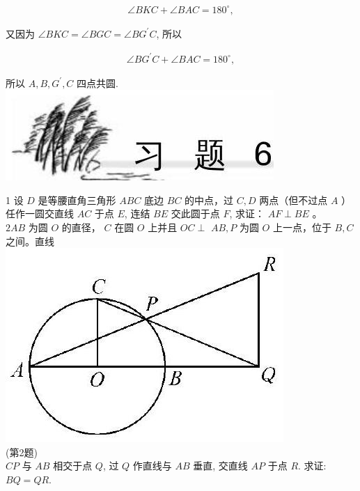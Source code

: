 \documentclass[10pt]{article}
\begin{document}
\begin{align*}
\angle B K C+\angle B A C=180^{\circ},
\end{align*}

又因为 $\angle B K C=\angle B G C=\angle B G^{\prime} C$, 所以

\begin{align*}
\angle B G^{\prime} C+\angle B A C=180^{\circ},
\end{align*}

所以 $A, B, G^{\prime}, C$ 四点共圆.\\
\includegraphics[max width=\textwidth, center]{2024_10_30_66b8e5e701da2093c133g-049}

1 设 $D$ 是等腰直角三角形 $A B C$ 底边 $B C$ 的中点，过 $C, D$ 两点（但不过点 $A$ ）任作一圆交直线 $A C$ 于点 $E$, 连结 $B E$ 交此圆于点 $F$, 求证： $A F \perp B E$ 。\\
$2 A B$ 为圆 $O$ 的直径， $C$ 在圆 $O$ 上并且 $O C \perp$ $A B, P$ 为圆 $O$ 上一点，位于 $B, C$ 之间。直线\\
\includegraphics[max width=\textwidth, center]{2024_10_30_66b8e5e701da2093c133g-049(1)}\\
(第2题)\\
$C P$ 与 $A B$ 相交于点 $Q$, 过 $Q$ 作直线与 $A B$ 垂直, 交直线 $A P$ 于点 $R$. 求证: $B Q=Q R$.
\end{document}
